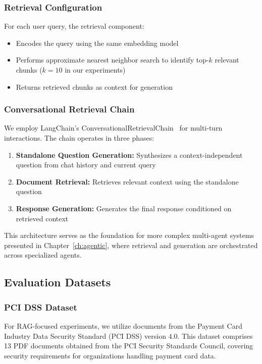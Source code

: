 \subsubsection{Retrieval Configuration}

For each user query, the retrieval component:
\begin{itemize}[leftmargin=*]
    \item Encodes the query using the same embedding model
    \item Performs approximate nearest neighbor search to identify top-$k$ relevant chunks ($k=10$ in our experiments)
    \item Returns retrieved chunks as context for generation
\end{itemize}

\subsubsection{Conversational Retrieval Chain}

We employ LangChain's ConversationalRetrievalChain~\cite{langchain2024} for multi-turn interactions. The chain operates in three phases:

\begin{enumerate}[leftmargin=*]
    \item \textbf{Standalone Question Generation:} Synthesizes a context-independent question from chat history and current query
    \item \textbf{Document Retrieval:} Retrieves relevant context using the standalone question
    \item \textbf{Response Generation:} Generates the final response conditioned on retrieved context
\end{enumerate}

This architecture serves as the foundation for more complex multi-agent systems presented in Chapter~\ref{ch:agentic}, where retrieval and generation are orchestrated across specialized agents.

\subsection{Evaluation Datasets}

\subsubsection{PCI DSS Dataset}

For RAG-focused experiments, we utilize documents from the Payment Card Industry Data Security Standard (PCI DSS) version 4.0. This dataset comprises 13 PDF documents obtained from the PCI Security Standards Council, covering security requirements for organizations handling payment card data.

